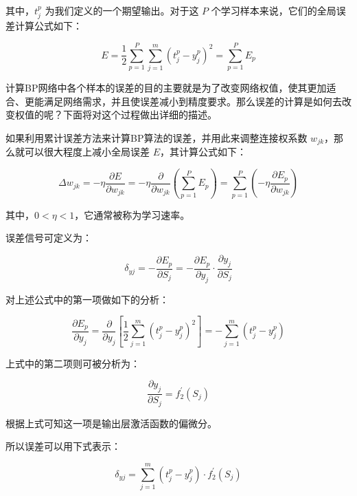 \documentclass[UTF8]{ctexart}
\begin{document}
其中，$t_{j}^{p}$ 为我们定义的一个期望输出。对于这 $P$ 个学习样本来说，它们的全局误差计算公式如下：

\begin{equation} 
E=\frac{1}{2} \sum_{p=1}^{P} \sum_{j=1}^{m}  (t_{j}^{p} - y_{j}^{p})^2 = \sum_{p=1}^{P} E_p
\end{equation}

计算BP网络中各个样本的误差的目的主要就是为了改变网络权值，使其更加适合、更能满足网络需求，并且使误差减小到精度要求。那么误差的计算是如何去改变权值的呢？下面将对这个过程做出详细的描述。 \par

如果利用累计误差方法来计算BP算法的误差，并用此来调整连接权系数 $w_{jk}$，那么就可以很大程度上减小全局误差 $E$，其计算公式如下：

\begin{equation} 
\Delta w_{jk} = - \eta \frac{\partial E}{\partial w_{jk}} = - \eta \frac{\partial}{\partial w_{jk}} \left(\sum_{p=1}^{P} E_p\right) = \sum_{p=1}^{P} \left(- \eta \frac{\partial E_p}{\partial w_{jk}}\right)
\end{equation}

其中，$0<\eta<1$，它通常被称为学习速率。 \par

误差信号可定义为：

\begin{equation}
\delta_{yj} = - \frac{\partial E_p}{\partial S_j} = - \frac{\partial E_p}{\partial y_j} \cdot \frac{\partial y_j}{\partial S_j}
\end{equation}

对上述公式中的第一项做如下的分析：

\begin{equation}
\frac{\partial E_p}{\partial y_j} = \frac{\partial}{\partial y_j} [\frac{1}{2} \sum_{j=1} ^ {m} (t_{j}^{p} - y_{j}^{p})^2] = - \sum_{j=1}^{m} (t_{j}^{p} - y_{j}^{p})
\end{equation}

上式中的第二项则可被分析为：

\begin{equation}
\frac{\partial y_j}{\partial S_j} = f_2^{'}(S_j)
\end{equation}

根据上式可知这一项是输出层激活函数的偏微分。 \par

所以误差可以用下式表示： \par

\begin{equation}
\delta_{yj} = \sum_{j=1}^{m} (t_{j}^{p} - y_{j}^{p}) \cdot f_2^{'}(S_j)
\end{equation}
\end{document}
